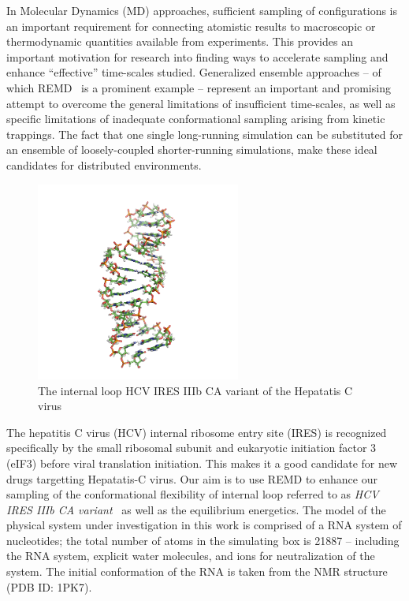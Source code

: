 \documentclass{rspublic}
\newcommand{\jhanote}[1]{ {\textcolor{red} { ***SJ: #1 }}}
\newcommand{\jhanote}[1]{}
\begin{document}

In Molecular Dynamics (MD) approaches, sufficient sampling of
configurations is an important requirement for connecting atomistic
results to macroscopic or thermodynamic quantities available from
experiments.  This provides an important motivation for research into
finding ways to accelerate sampling and enhance ``effective''
time-scales studied. Generalized ensemble approaches -- of which
REMD~\citep{Sugita:1999rm} is a prominent example -- represent an
important and promising attempt to overcome the general limitations of
insufficient time-scales, as well as specific limitations of
inadequate conformational sampling arising from kinetic trappings.
The fact that one single long-running simulation can be substituted
for an ensemble of loosely-coupled shorter-running simulations, make
these ideal candidates for distributed environments.

\begin{figure}[t]
      \centering
      \includegraphics[width=0.6\textwidth]{1KP7}   
      \caption{The internal loop HCV IRES IIIb CA variant of the
        Hepatatis C virus}
      \label{}
\end{figure}

The hepatitis C virus (HCV) internal ribosome entry site (IRES) is
recognized specifically by the small ribosomal subunit and eukaryotic
initiation factor 3 (eIF3) before viral translation initiation.  This
makes it a good candidate for new drugs targetting Hepatatis-C virus.
Our aim is to use REMD to enhance our sampling of the conformational
flexibility of internal loop referred to as {\it HCV IRES IIIb CA
  variant}~\citep{Collier:2002wd} as well as the equilibrium
energetics.  The model of the physical system under investigation in
this work is comprised of a RNA system of nucleotides; the total
number of atoms in the simulating box is 21887 -- including the RNA
system, explicit water molecules, and ions for neutralization of the
system.  The initial conformation of the RNA is taken from the NMR
structure (PDB ID: 1PK7).
\end{document}
